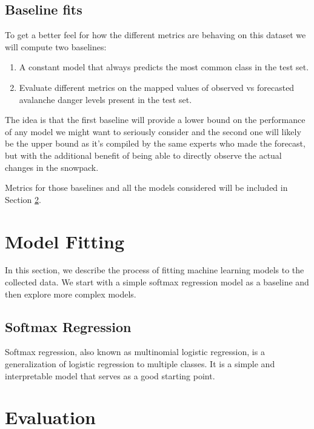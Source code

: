 \documentclass{article}
\begin{document}
\subsection{Baseline fits}

	To get a better feel for how the different metrics are behaving on this dataset we will compute two baselines: 
	\begin{enumerate}
		\item A constant model that always predicts the most common class in the test set.
		\item Evaluate different metrics on the mapped values of observed vs forecasted avalanche danger levels present in the test set.
	\end{enumerate}
	The idea is that the first baseline will provide a lower bound on the performance of any model we might want to seriously consider and the second one will likely be the upper bound as it's compiled by the same experts who made the forecast, but with the additional benefit of being able to directly observe the actual changes in the snowpack.

	Metrics for those baselines and all the models considered will be included in Section \ref{sec:evaluation}.

\section{Model Fitting}

	In this section, we describe the process of fitting machine learning models to the collected data. We start with a simple softmax regression model as a baseline and then explore more complex models.

\subsection{Softmax Regression}

	Softmax regression, also known as multinomial logistic regression, is a generalization of logistic regression to multiple classes. It is a simple and interpretable model that serves as a good starting point.

\section{Evaluation}\label{sec:evaluation}
\end{document}
